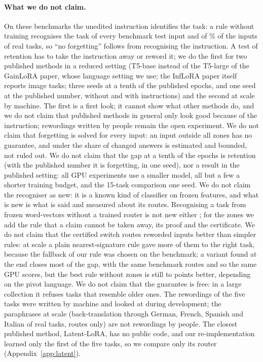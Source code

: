 \paragraph{What we do not claim.} On these benchmarks the unedited instruction identifies the task: a
rule without training recognises the task of every benchmark test input and of \ManyNearRightPct{}\% of
the inputs of \ManyTasks{} real tasks, so ``no forgetting'' follows from recognising the instruction.
A test of retention has to take the instruction away or reword it; we do the first for two published
methods in a reduced setting (T5-base instead of the T5-large of the GainLoRA paper, whose language
setting we use; the InfLoRA paper itself reports image tasks; three seeds at a tenth of the published
epochs, and one seed at the published number, without and with instructions)
and the second at scale by machine. The first is a first look; it cannot show what other methods do, and we do not claim that
published methods in general only look good because of the instruction; rewordings written by people remain the open experiment. We do not claim that forgetting
is solved for every input: an input outside all zones has no guarantee, and under \recog{} the share
of changed answers is estimated and bounded, not ruled out. We do not claim that the gap at a tenth of
the epochs is retention (with the published number it is forgetting, in one seed), nor a result in the published setting: all GPU experiments use a smaller model, all but a few a shorter training budget, and the 15-task comparison one seed. We do not claim the recogniser as new: it is a known kind of classifier on frozen features, and what is new is what is said and measured about its routes. Recognising a task from frozen word-vectors without a trained router is not new either \citep{latentlora2026}; for the zones we add
the rule that a claim cannot be taken away, its proof and the certificate. We do not claim that the
certified switch routes reworded inputs better than simpler rules: at scale a plain nearest-signature
rule gave more of them to the right task, because the fallback of our rule was chosen on the
benchmark; a variant found at the end closes most of the gap, with the same benchmark routes and so the same GPU scores, but the best rule without zones is still
\RerouteZonesCost{} to \RerouteZonesCostEs{} points better, depending on the pivot language. We do not claim that the guarantee is free: in a large collection it refuses tasks that resemble older ones. The rewordings of the five tasks
were written by machine and looked at during development; the paraphrases at scale (back-translation
through German, French, Spanish and Italian of \WidenTasksEval{} real tasks, routes only) are not
rewordings by people. The closest published method, Latent-LoRA, has no public code, and our
re-implementation learned only the first of the five tasks, so we compare only its router
(Appendix~\ref{app:latent}).
